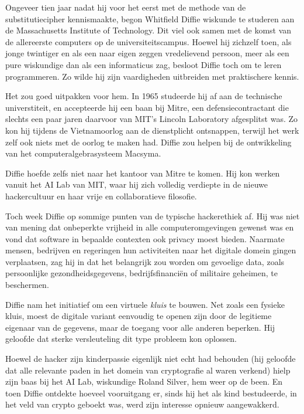 \documentclass[
  a5paper,
  smalldemyvopaper,11pt,twoside,onecolumn,openright,extrafontsizes,
hidelinks]{memoir}
\begin{document}
Ongeveer tien jaar nadat hij voor het eerst met de methode van de
substitutiecipher kennismaakte, begon Whitfield Diffie wiskunde te
studeren aan de Massachusetts Institute of Technology. Dit viel ook
samen met de komst van de allereerste computers op de
universiteitscampus. Hoewel hij zichzelf toen, als jonge twintiger en
als een naar eigen zeggen vredelievend persoon, meer als een pure
wiskundige dan als een informaticus zag, besloot Diffie toch om te leren
programmeren. Zo wilde hij zijn vaardigheden uitbreiden met praktischere
kennis.

Het zou goed uitpakken voor hem. In 1965 studeerde hij af aan de
technische universtiteit, en accepteerde hij een baan bij Mitre, een
defensiecontractant die slechts een paar jaren daarvoor van MIT's
Lincoln Laboratory afgesplitst was. Zo kon hij tijdens de Vietnamoorlog
aan de dienstplicht ontsnappen, terwijl het werk zelf ook niets met de
oorlog te maken had. Diffie zou helpen bij de ontwikkeling van het
computeralgebrasysteem Macsyma.

Diffie hoefde zelfs niet naar het kantoor van Mitre te komen. Hij kon
werken vanuit het AI Lab van MIT, waar hij zich volledig verdiepte in de
nieuwe hackercultuur en haar vrije en collaboratieve filosofie.

Toch week Diffie op sommige punten van de typische hackerethiek af. Hij
was niet van mening dat onbeperkte vrijheid in alle computeromgevingen
gewenst was en vond dat software in bepaalde contexten ook privacy moest
bieden. Naarmate mensen, bedrijven en regeringen hun activiteiten naar
het digitale domein gingen verplaatsen, zag hij in dat het belangrijk
zou worden om gevoelige data, zoals persoonlijke gezondheidsgegevens,
bedrijfsfinanciën of militaire geheimen, te beschermen.

Diffie nam het initiatief om een virtuele \emph{kluis} te bouwen. Net
zoals een fysieke kluis, moest de digitale variant eenvoudig te openen
zijn door de legitieme eigenaar van de gegevens, maar de toegang voor
alle anderen beperken. Hij geloofde dat sterke versleuteling dit type
probleem kon oplossen.

Hoewel de hacker zijn kinderpassie eigenlijk niet echt had behouden (hij
geloofde dat alle relevante paden in het domein van cryptografie al
waren verkend) hielp zijn baas bij het AI Lab, wiskundige Roland Silver,
hem weer op de been. En toen Diffie ontdekte hoeveel vooruitgang er,
sinds hij het als kind bestudeerde, in het veld van crypto geboekt was,
werd zijn interesse opnieuw aangewakkerd.
\end{document}
